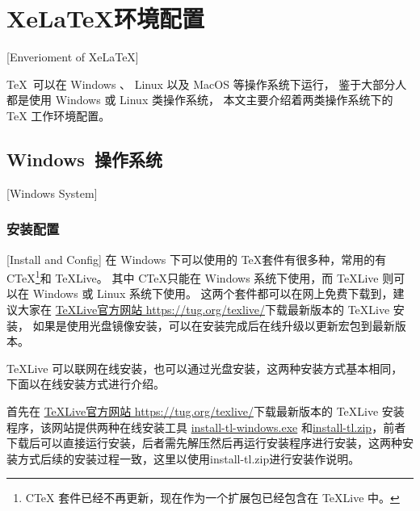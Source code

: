 
%
%
%

\chapter{XeLaTeX环境配置}[Enverioment of XeLaTeX]
\label{chap02}

\TeX{}~可以在 Windows 、 Linux 以及 MacOS 等操作系统下运行，
鉴于大部分人都是使用 Windows 或 Linux 类操作系统，
本文主要介绍着两类操作系统下的 \TeX{} 工作环境配置。

\section{Windows~操作系统}[Windows System]

\subsection{安装配置}[Install and Config]
在 Windows 下可以使用的 \TeX{}套件有很多种，常用的有 C\TeX{}\footnote{C\TeX{} 套件已经不再更新，现在作为一个扩展包已经包含在 \TeX{}Live 中。}和 \TeX{}Live。
其中 C\TeX{}只能在 Windows 系统下使用，而 \TeX{}Live 则可以在 Windows 或 Linux 系统下使用。
这两个套件都可以在网上免费下载到，建议大家在 \href{https://tug.org/texlive/}{\TeX{}Live官方网站 https://tug.org/texlive/}下载最新版本的 \TeX{}Live 安装，
如果是使用光盘镜像安装，可以在安装完成后在线升级以更新宏包到最新版本。

\TeX{}Live 可以联网在线安装，也可以通过光盘安装，这两种安装方式基本相同，下面以在线安装方式进行介绍。

首先在 \href{https://tug.org/texlive/}{\TeX{}Live官方网站 https://tug.org/texlive/}下载最新版本的 \TeX{}Live 安装程序，该网站提供两种在线安装工具 \href{https://mirror.ctan.org/systems/texlive/tlnet/install-tl-windows.exe}{install-tl-windows.exe} 和\href{https://mirror.ctan.org/systems/texlive/tlnet/install-tl.zip}{install-tl.zip}，前者下载后可以直接运行安装，后者需先解压然后再运行安装程序进行安装，这两种安装方式后续的安装过程一致，这里以使用install-tl.zip进行安装作说明。

